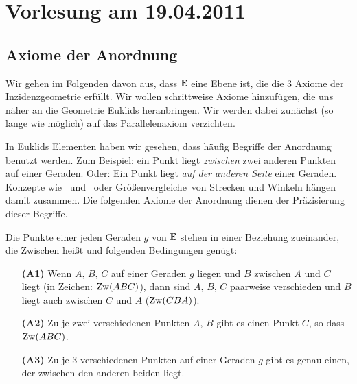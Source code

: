 \section*{Vorlesung am 19.04.2011}

\subsection*{Axiome der Anordnung}



Wir gehen im Folgenden davon aus, dass $\mathbb E$ eine Ebene ist, die die 3 Axiome der Inzidenzgeometrie
erfüllt. Wir wollen schrittweise Axiome hinzufügen, die uns näher an die Geometrie Euklids
heranbringen.  Wir werden dabei zunächst (so lange wie möglich) auf das Parallelenaxiom verzichten.

In Euklids Elementen haben wir gesehen, dass häufig Begriffe der Anordnung benutzt werden. Zum
Beispiel: \glqq ein Punkt %
liegt {\em zwischen} zwei anderen Punkten %
auf einer Geraden\grqq . 
Oder: \glqq Ein Punkt %
liegt {\em auf der anderen Seite} einer Geraden\grqq .
Konzepte wie \grqq\  und \grqq\
oder \glqq Größenvergleiche\grqq\ von Strecken und Winkeln 
hängen damit zusammen.
Die folgenden Axiome der Anordnung dienen der Präzisierung dieser Begriffe.

Die Punkte einer jeden Geraden $g$ von $\mathbb E$ stehen in einer Beziehung zueinander, die
\glqq{}Zwischen\grqq{} hei{\ss}t und folgenden Bedingungen gen\"{u}gt:

\begin{enumerate}
    \item[{\bf (A1)}] Wenn $A,\,B,\,C$ auf einer Geraden $g$ liegen und $B$ zwischen $A$ und $C$
    liegt (in Zeichen: $\operatorname{Zw}(ABC)$), dann sind $A,\,B,\,C$ paarweise
    verschieden und $B$ liegt auch zwischen $C$ und $A$ ($\operatorname{Zw}(CBA)$).
    \item[{\bf (A2)}] Zu je zwei verschiedenen Punkten $A,\,B$ gibt es
    einen Punkt $C$, so dass $\operatorname{Zw}(ABC)$.
    \item[{\bf (A3)}] Zu je 3 verschiedenen Punkten auf einer Geraden
    $g$ gibt es genau einen, der zwischen den anderen beiden
    liegt.
\end{enumerate}

